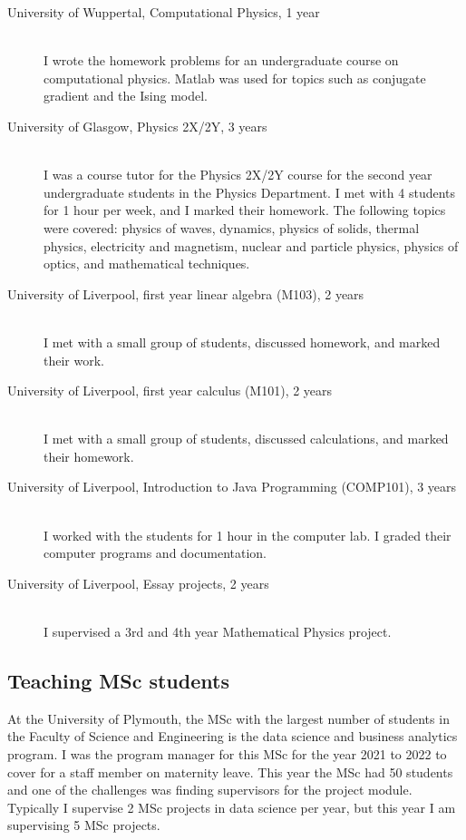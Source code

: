 \documentclass[12pt]{article}
\begin{document}
\begin{description}
  \item[University of Wuppertal, Computational Physics, 1 year] \hfill \\
I wrote
the homework problems for an 
undergraduate course on computational
physics. Matlab was used for topics such as conjugate gradient
and the Ising model.

  \item[University of Glasgow, Physics 2X/2Y, 3 years] \hfill \\
I was a course tutor for the Physics 2X/2Y course
for the second year undergraduate students
in the Physics Department. I met with 4 students for 1 hour per week,
and I marked their homework.
The following topics were covered:
physics of waves, dynamics, physics of solids, thermal physics,
electricity and magnetism, nuclear and particle physics, physics of
optics, and mathematical techniques.

\item[University of Liverpool, first year linear algebra
 (M103), 2 years] \hfill \\
I met with a small group of students, discussed homework,
and marked their work.

\item[University of Liverpool, first year calculus (M101), 2 years] \hfill \\
I met with a small group of students, discussed calculations,
and marked their homework.



\item[University of Liverpool, Introduction to Java Programming
 (COMP101), 3 years] \hfill \\
I worked with the students for 1 hour in the computer lab.
I graded their computer programs and documentation.



\item[University of Liverpool, Essay projects, 2 years] \hfill \\
I supervised a 3rd and 4th year Mathematical Physics project.

\end{description}

\subsection{Teaching MSc students}

At the University of Plymouth, the MSc with the largest
number of students in the Faculty of Science and Engineering
is the data science and business analytics program. I was the 
program manager for this MSc for the year 
2021 to 2022 to cover for a staff member
on maternity leave. This year the MSc had 50 students and one
of the challenges was finding supervisors for the project module.
Typically I supervise 2 MSc projects in data science per year, but this year 
I am supervising 5 MSc projects.
\end{document}
